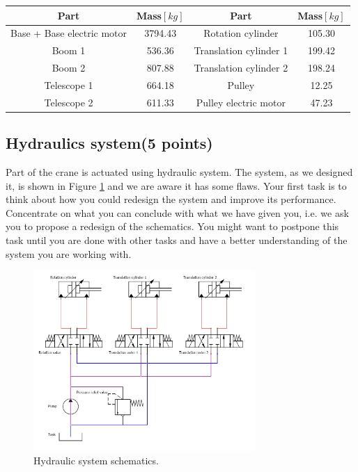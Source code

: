 \documentclass{article}
\begin{document}
	\begin{center}
		\label{tab:crane_tab}
		\begin{tabular}{||c|| c || c|| c ||}
			\hline
			Part & Mass$[kg]$ & Part & Mass$[kg]$ \\
			\hline\hline
			Base + Base electric motor & 3794.43 & Rotation cylinder & 105.30\\ 
			\hline
			Boom 1 & 536.36 & Translation cylinder 1 & 199.42\\
			\hline
			Boom 2 & 807.88 & Translation cylinder 2 & 198.24\\
			\hline
			Telescope 1 & 664.18 & Pulley & 12.25\\
			\hline
			Telescope 2 & 611.33 & Pulley electric motor & 47.23\\
			\hline
		\end{tabular}
	\end{center}
	
	\subsection{Hydraulics system(5 points)}
	
	Part of the crane is actuated using hydraulic system. The system, as we designed it, is shown in Figure \ref{fig:hydraulic} and we are aware it has some flaws. Your first task is to think about how you could redesign the system and improve its performance. Concentrate on what you can conclude with what we have given you, i.e. we ask you to propose a redesign of the schematics. You might want to postpone this task until you are done with other tasks and have a better understanding of the system you are working with.
	
	\begin{figure}[h!]
		\centering
		\includegraphics[width=0.75\textwidth]{hidraulika_shema.jpg}
		\caption{Hydraulic system schematics.}
		\label{fig:hydraulic}
	\end{figure}
	
\end{document}

